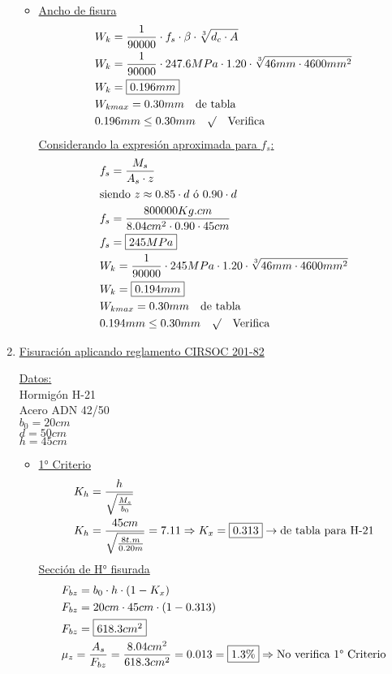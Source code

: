 \begin{enumerate}
\begin{itemize}
\item \underline{Ancho de fisura}
\begin{align*}
& W_k = \frac{1}{90000} \cdot f_s \cdot \beta \cdot \sqrt[3]{d_c \cdot A} \\
& W_k = \frac{1}{90000} \cdot 247.6MPa \cdot 1.20 \cdot \sqrt[3]{46mm \cdot 4600mm^2} \\
& W_k = \framebox{$0.196mm$} \\
& W_{kmax} = 0.30mm \quad \text{de tabla}\\
& 0.196mm \leq 0.30mm \quad \surd \quad \text{Verifica}
\end{align*}
\underline{Considerando la expresión aproximada para $f_s$:}
\begin{align*}
& f_s = \frac{M_s}{A_s \cdot z}\\
& \text{siendo } z \approx 0.85 \cdot d \text{ ó } 0.90 \cdot d \\
& f_s = \frac{800000Kg.cm}{ 8.04 cm^2 \cdot 0.90 \cdot 45cm}\\
& f_s = \framebox{$245MPa$} \\
& W_k = \frac{1}{90000} \cdot 245MPa \cdot 1.20 \cdot \sqrt[3]{46mm \cdot 4600mm^2} \\
& W_k = \framebox{$0.194mm$} \\
& W_{kmax} = 0.30mm \quad \text{de tabla}\\
& 0.194mm \leq 0.30mm \quad \surd \quad \text{Verifica}
\end{align*}
\end{itemize}
\newpage
\item \underline{Fisuración aplicando reglamento CIRSOC 201-82}

\underline{Datos:}\\
Hormigón H-21 \\
Acero ADN 42/50 \\
$b_0 = 20cm $\\
$d = 50cm $\\
$h = 45cm $\\

\begin{itemize}
\item \underline{1° Criterio}
\begin{align*}
& K_h = \frac{h}{\sqrt{\frac{M_s}{b_0}}} \\
& K_h = \frac{45cm}{\sqrt{\frac{8t.m}{0.20m}}} = 7.11 \Rightarrow K_x = \framebox{$0.313$} \rightarrow \text{de tabla para H-21}
\end{align*}
\underline{Sección de H° fisurada}
\begin{align*}
& F_{bz} = b_0 \cdot h \cdot (1-K_x) \\
& F_{bz} = 20cm \cdot 45cm \cdot (1-0.313) \\
& F_{bz} = \framebox{$618.3cm^2$} \\
& \mu_z = \frac{A_s}{F_{bz}} = \frac{8.04cm^2}{618.3cm^2} = 0.013 = \framebox{$1.3\%$} \Rightarrow \text{No verifica 1° Criterio}
\end{align*}


\end{itemize}
\end{enumerate}
